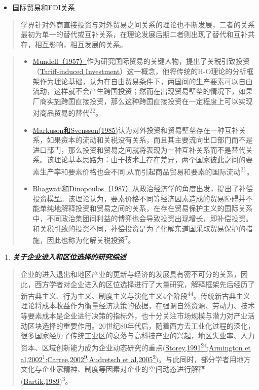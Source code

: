 \documentclass[]{article}
\providecommand{\tightlist}{%
  \setlength{\itemsep}{0pt}\setlength{\parskip}{0pt}}
\begin{document}
\begin{itemize}
\tightlist
\item
  国际贸易和FDI关系
\end{itemize}

\begin{quote}
学界针对外商直接投资与对外贸易之间关系的理论也不断发展，二者的关系最初为单一的替代或互补关系，在理论发展后期二者则出现了替代和互补共存，相互影响，相互发展的关系。
\end{quote}

\begin{quote}
\begin{itemize}
\tightlist
\item
  \href{www.baidu.com}{Mundell（1957）}作为研究国际贸易的关键人物，提出了关税引致投资（\href{www.baidu.com}{Tariff-induced
  Investment}）这一概念，他将传统的H-O理论的分析框架作为理论基础，认为在自由贸易条件下，两国间的生产要素可以自由流动，这样就不会产生跨国投资；然而在出现贸易壁垒的情况下，如果厂商实施跨国直接投资，那么这种跨国直接投资在一定程度上可以实现对商品贸易的替代\textsuperscript{22}。
\item
  \href{www.baidu.com}{Markuson和Svensson(1985)}认为对外投资和贸易壁垒存在一种互补关系，如果资本的流动和关税没有关系，而且其主要流向出口部门而不是进口部门，那么投资和贸易之间就将表现为一种互补关系而不是替代关系。该理论基本思路为：由于技术上存在差异，两个国家彼此之间的要素生产率和要素价格也会不同,从而引起商品贸易和要素的国际流动\textsuperscript{21}。
\item
  \href{www.baidu.com}{Bhagwati和Dinopoulos（1987）}从政治经济学的角度出发，提出了补偿投资模型。该理论认为，要素价格不同等经济因素造成的贸易障碍并不能单纯地解释投资和贸易之间的关系，在存在贸易保护主义的国际关系中，不同政治集团间利益的博弈也会导致投资出现增长，即补偿投资。和关税引致的投资不同，补偿投资是为了化解东道国采取贸易保护的措施，因此也称为化解关税投资\textsuperscript{7}。
\end{itemize}
\end{quote}

\begin{enumerate}
\def\labelenumi{\arabic{enumi}.}
\setcounter{enumi}{1}
\tightlist
\item
  \textbf{\emph{关于企业进入和区位选择的研究综述}}
\end{enumerate}

\begin{quote}
企业的进入退出和地区产业的更新与经济的发展具有密不可分的关系，因此，西方学者对企业进入的区位选择进行了大量研究，解释框架先后经历了新古典主义、行为主义、制度主义与演化主义4个阶段\textsuperscript{44}。传统新古典主义理论将成本收益作为衡量经济决策的依据，在强调自然资源、劳动力、技术等要素成本是企业进行决策的指标外，也十分关注市场规模与潜力对产业活动区块选择的重要作用。20世纪80年代后，随着西方去工业化过程的深化，很多国家经历了传统工业区的衰落与高科技产业的兴起，地区失业率、人力资本、区域创新能力成为企业动态研究的重点(\href{www.baidu.com}{Storey,1991\textsuperscript{24};Armington
et al,2002\textsuperscript{1};Carree,2002\textsuperscript{9};Audretsch
et
al,2005\textsuperscript{2}})。与此同时，部分学者用地方文化与企业家精神、制度等因素对企业的空间动态进行解释(\href{www.baidu.com}{Bartik,1989})\textsuperscript{3}。
\end{quote}
\end{document}

